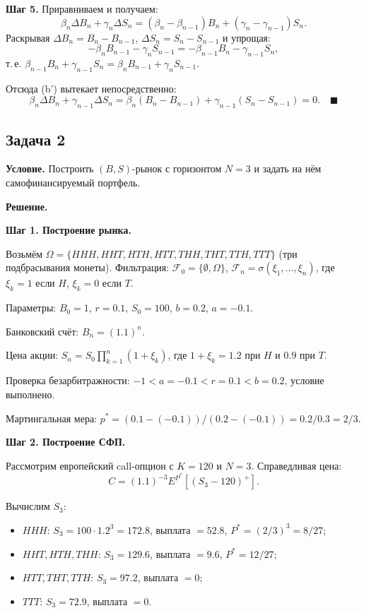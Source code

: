\documentclass[12pt,a4paper]{article}
\theoremstyle{zadacha}
\begin{document}
\textbf{Шаг 5.} Приравниваем и получаем:
\[
\beta_n \Delta B_n + \gamma_n \Delta S_n = (\beta_n - \beta_{n-1}) B_n + (\gamma_n - \gamma_{n-1}) S_n.
\]
Раскрывая $\Delta B_n = B_n - B_{n-1}$, $\Delta S_n = S_n - S_{n-1}$ и упрощая:
\[
-\beta_n B_{n-1} - \gamma_n S_{n-1} = -\beta_{n-1} B_n - \gamma_{n-1} S_n,
\]
т.\,е. $\beta_{n-1} B_n + \gamma_{n-1} S_n = \beta_n B_{n-1} + \gamma_n S_{n-1}$.

Отсюда (b') вытекает непосредственно:
\[
\beta_n \Delta B_n + \gamma_{n-1} \Delta S_n = \beta_n(B_n - B_{n-1}) + \gamma_{n-1}(S_n - S_{n-1}) = 0. \quad \blacksquare
\]

\subsection*{Задача 2}

\textbf{Условие.} Построить $(B,S)$-рынок с горизонтом $N = 3$ и задать на нём самофинансируемый портфель.

\medskip
\textbf{Решение.}

\textbf{Шаг 1. Построение рынка.}

Возьмём $\Omega = \{HHH, HHT, HTH, HTT, THH, THT, TTH, TTT\}$ (три подбрасывания монеты).
Фильтрация: $\mathcal{F}_0 = \{\emptyset, \Omega\}$, $\mathcal{F}_n = \sigma(\xi_1, \ldots, \xi_n)$, где $\xi_k = 1$ если $H$, $\xi_k = 0$ если $T$.

Параметры: $B_0 = 1$, $r = 0.1$, $S_0 = 100$, $b = 0.2$, $a = -0.1$.

Банковский счёт: $B_n = (1.1)^n$.

Цена акции: $S_n = S_0 \prod_{k=1}^n (1 + \xi_k)$, где $1 + \xi_k = 1.2$ при $H$ и $0.9$ при $T$.

Проверка безарбитражности: $-1 < a = -0.1 < r = 0.1 < b = 0.2$, условие выполнено.

Мартингальная мера: $p^* = (0.1 - (-0.1))/(0.2 - (-0.1)) = 0.2/0.3 = 2/3$.

\textbf{Шаг 2. Построение СФП.}

Рассмотрим европейский call-опцион с $K = 120$ и $N = 3$. Справедливая цена:
\[
C = (1.1)^{-3} E^{P^*}[(S_3 - 120)^+].
\]

Вычислим $S_3$:
\begin{itemize}
  \item $HHH$: $S_3 = 100 \cdot 1.2^3 = 172.8$, выплата $= 52.8$, $P^* = (2/3)^3 = 8/27$;
  \item $HHT, HTH, THH$: $S_3 = 129.6$, выплата $= 9.6$, $P^* = 12/27$;
  \item $HTT, THT, TTH$: $S_3 = 97.2$, выплата $= 0$;
  \item $TTT$: $S_3 = 72.9$, выплата $= 0$.
\end{itemize}
\end{document}
